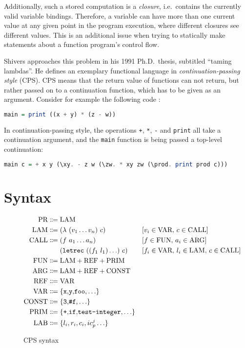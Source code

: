 \documentclass[a4paper,halfparskip,DIV=10,11pt]{scrbook}
\begin{document}
Additionally, such a stored computation is a \textit{closure}, i.e.\ contains the currently valid variable bindings. Therefore, a variable can have more than one current value at any given point in the program execution, where different closures see different values. This is an additional issue when trying to statically make statements about a function program’s control flow.

Shivers approaches this problem in his 1991 Ph.D.\ thesis, subtitled “taming lambdas”. He defines an exemplary functional language in \textit{continuation-passing style} (CPS). CPS means that the return value of functions can not return, but rather passed on to a continuation function, which has to be given as an argument. Consider for example the following code :
\begin{lstlisting}[language=Haskell]
main = print ((x + y) * (z - w))
\end{lstlisting}
In continuation-passing style, the operations \lstinline!+!, \lstinline!*!, \lstinline!-! and \lstinline!print! all take a continuation argument, and the \lstinline!main! function is being passed a top-level continuation: 
\begin{lstlisting}[language=Haskell]
main c = + x y (\xy. - z w (\zw. * xy zw (\prod. print prod c)))
\end{lstlisting}

\section{Syntax}

\begin{figure}
\begin{framed}
\begin{align*}
\text{PR} &\Coloneqq \text{LAM} \\
\text{LAM} &\Coloneqq (\lambda\ (v_1\ldots v_n)\ c) && [v_i\in \text{VAR},\, c\in\text{CALL}] \\
\text{CALL} &\Coloneqq (f\ a_1 \ldots a_n) && [f\in \text{FUN},\, a_i\in\text{ARG}] \\
&\phantom{\strut\Coloneqq\strut} (\text{\texttt{letrec}}\ ((f_1\ l_1)\ldots)\ c) && [f_i\in \text{VAR},\,l_i\in\text{LAM},\,c\in\text{CALL}] \\
\text{FUN} &\Coloneqq \text{LAM} + \text{REF} + \text{PRIM} \\
\text{ARG} &\Coloneqq \text{LAM} + \text{REF} + \text{CONST} \\
\text{REF} &\Coloneqq \text{VAR} \\
\text{VAR} &\Coloneqq \{\text{\texttt{x},\texttt{y},\texttt{foo},}\ldots\} \\
\text{CONST} &\Coloneqq \{\text{\texttt{3},\texttt{\#f},}\ldots\} \\
\text{PRIM} &\Coloneqq \{\text{\texttt{+},\texttt{if},\texttt{test-integer},}\ldots\} \\
\text{LAB} &\Coloneqq \{l_i,r_i,c_i,ic_p^j\ldots\}
\end{align*}
\end{framed}
\caption{CPS syntax}
\label{fig:syntax}
\end{figure}
\end{document}
